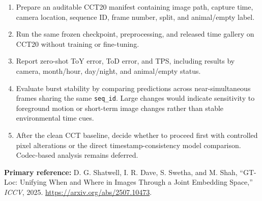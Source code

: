 \documentclass[10pt,a4paper]{article}
\begin{document}
\begin{enumerate}
  \item Prepare an auditable CCT20 manifest containing image path, capture time, camera location, sequence ID, frame number, split, and animal/empty label.
  \item Run the same frozen checkpoint, preprocessing, and released time gallery on CCT20 without training or fine-tuning.
  \item Report zero-shot ToY error, ToD error, and TPS, including results by camera, month/hour, day/night, and animal/empty status.
  \item Evaluate burst stability by comparing predictions across near-simultaneous frames sharing the same \texttt{seq\_id}. Large changes would indicate sensitivity to foreground motion or short-term image changes rather than stable environmental time cues.
  \item After the clean CCT baseline, decide whether to proceed first with controlled pixel alterations or the direct timestamp-consistency model comparison. Codec-based analysis remains deferred.
\end{enumerate}

\vfill
\footnotesize
\textbf{Primary reference:}
D. G. Shatwell, I. R. Dave, S. Swetha, and M. Shah,
``GT-Loc: Unifying When and Where in Images Through a Joint Embedding Space,''
\emph{ICCV}, 2025.
\url{https://arxiv.org/abs/2507.10473}.
\end{document}
